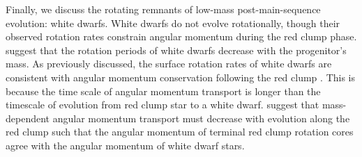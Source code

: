 Finally, we discuss the rotating remnants of low-mass post-main-sequence evolution: white dwarfs.
White dwarfs do not evolve rotationally, though their observed rotation rates constrain angular momentum during the red clump phase.
\citet{hermes_white_2017} suggest that the rotation periods of white dwarfs decrease with the progenitor's mass.
As previously discussed, the surface rotation rates of white dwarfs are consistent with angular momentum conservation following the red clump \citep{den_hartogh_constraining_2019, cantiello_angular_2014}.
This is because the time scale of angular momentum transport is longer than the timescale of evolution from red clump star to a white dwarf.
\citet{den_hartogh_constraining_2019} suggest that mass-dependent angular momentum transport must decrease with evolution along the red clump such that the angular momentum of terminal red clump rotation cores agree with the angular momentum of white dwarf stars.

